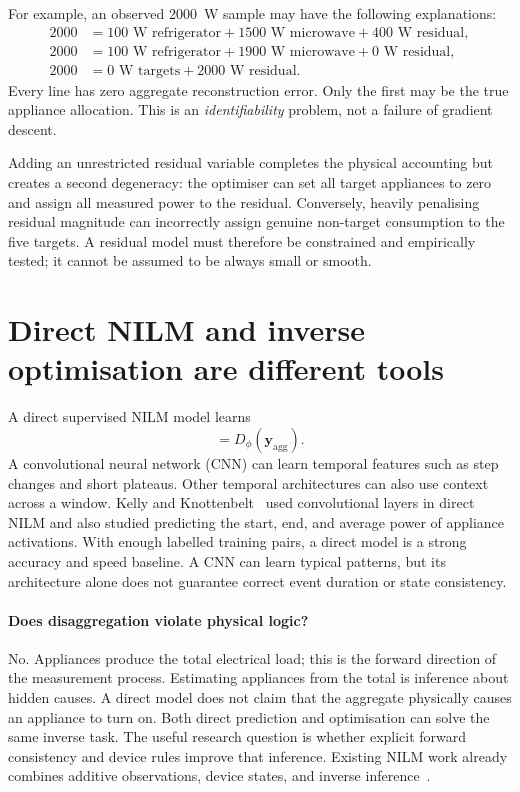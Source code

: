 \documentclass[11pt]{article}
\newcommand{\vect}[1]{\mathbf{#1}}
\begin{document}
For example, an observed 2000~W sample may have the following explanations:
\begin{align*}
    2000&=100\text{ W refrigerator}+1500\text{ W microwave}+400\text{ W residual},\\
    2000&=100\text{ W refrigerator}+1900\text{ W microwave}+0\text{ W residual},\\
    2000&=0\text{ W targets}+2000\text{ W residual}.
\end{align*}
Every line has zero aggregate reconstruction error. Only the first may be the true appliance allocation. This is an \emph{identifiability} problem, not a failure of gradient descent.

Adding an unrestricted residual variable completes the physical accounting but creates a second degeneracy: the optimiser can set all target appliances to zero and assign all measured power to the residual. Conversely, heavily penalising residual magnitude can incorrectly assign genuine non-target consumption to the five targets. A residual model must therefore be constrained and empirically tested; it cannot be assumed to be always small or smooth.

\section{Direct NILM and inverse optimisation are different tools}

A direct supervised NILM model learns
\begin{equation}
    [\hat{\vect{p}}_1,\ldots,\hat{\vect{p}}_5]
    =D_{\phi}(\vect{y}_{\mathrm{agg}}).
    \label{eq:direct_nilm}
\end{equation}
A convolutional neural network (CNN) can learn temporal features such as step changes and short plateaus. Other temporal architectures can also use context across a window. Kelly and Knottenbelt~\cite{kelly2015} used convolutional layers in direct NILM and also studied predicting the start, end, and average power of appliance activations. With enough labelled training pairs, a direct model is a strong accuracy and speed baseline. A CNN can learn typical patterns, but its architecture alone does not guarantee correct event duration or state consistency.

\paragraph{Does disaggregation violate physical logic?}
No. Appliances produce the total electrical load; this is the forward direction of the measurement process. Estimating appliances from the total is inference about hidden causes. A direct model does not claim that the aggregate physically causes an appliance to turn on. Both direct prediction and optimisation can solve the same inverse task. The useful research question is whether explicit forward consistency and device rules improve that inference. Existing NILM work already combines additive observations, device states, and inverse inference~\cite{kolter2012,zhong2014}.
\end{document}
